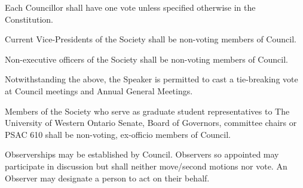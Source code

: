 \begin{longenum}[label*=\thesubsection.\arabic*., align=left]
    \item Each Councillor shall have one vote unless specified otherwise in the Constitution. 
    \item Current Vice-Presidents of the Society shall be non-voting members of Council.
    \item Non-executive officers of the Society shall be non-voting members of Council.
    	\begin{longenum}[label*=\arabic*., align=left]
    \item Notwithstanding the above, the Speaker is permitted to cast a tie-breaking vote at Council meetings and Annual General Meetings.
  	\end{longenum}
    \item Members of the Society who serve as graduate student representatives to The University of Western Ontario Senate, Board of Governors, committee chairs or PSAC 610 shall be non-voting, ex-officio members of Council.
    \item Observerships may be established by Council. Observers so appointed may participate in discussion but shall neither move/second motions nor vote. An Observer may designate a person to act on their behalf. 
\end{longenum}


